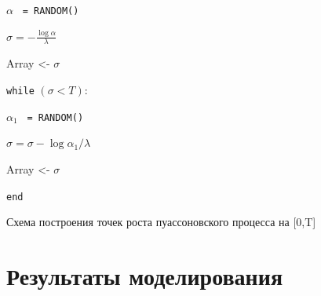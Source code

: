 \documentclass[a4paper,12pt]{article}
\numberwithin{equation}{section}
\begin{document}
	\begin{algorithm}[H]
		\SetAlgoLined %
		
		
		
		$\alpha$ \texttt{ = RANDOM()}
		
		$\sigma = -\frac{\log \alpha}{\lambda}$
		
		Array <- $\sigma$
		
		\texttt{while} $(\sigma < T)$:
		
		$\alpha_1$ \texttt{ = RANDOM()}
		
		$\sigma = \sigma - \log \alpha_1/\lambda$
		
		Array <- $\sigma$
		
		\texttt{end}
		
		\caption{Схема построения точек роста пуассоновского процесса на [0,T]}
	\end{algorithm}
	\section{Результаты моделирования}
\end{document}
